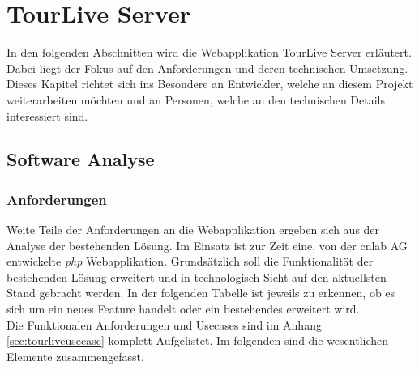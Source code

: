 \chapter{TourLive Server}
\label{sec:tourliveserver}
In den folgenden Abschnitten wird die Webapplikation TourLive Server erläutert. Dabei liegt der Fokus auf den Anforderungen und deren technischen Umsetzung. Dieses Kapitel richtet sich ins Besondere an Entwickler, welche an diesem Projekt weiterarbeiten möchten und an Personen, welche an den technischen Details interessiert sind.

\section{Software Analyse}
\subsection{Anforderungen}
Weite Teile der Anforderungen an die Webapplikation ergeben sich aus der Analyse der bestehenden Lösung. Im Einsatz ist zur Zeit eine, von der cnlab AG entwickelte \textit{\gls{php}} Webapplikation. Grundsätzlich soll die Funktionalität der bestehenden Lösung erweitert und in technologisch Sicht auf den aktuellsten Stand gebracht werden. In der folgenden Tabelle ist jeweils zu erkennen, ob es sich um ein neues Feature handelt oder ein bestehendes erweitert wird.
\\
Die Funktionalen Anforderungen und Usecases sind im Anhang \ref{sec:tourliveusecase} komplett Aufgelistet. Im folgenden sind die wesentlichen Elemente zusammengefasst.

